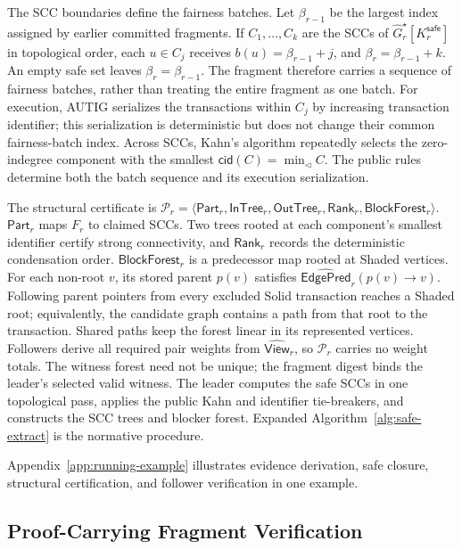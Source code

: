 The SCC boundaries define the fairness batches.  Let $\beta_{r-1}$ be the
largest index assigned by earlier committed fragments.  If
$C_1,\ldots,C_k$ are the SCCs of
$\widehat G_r^\star[K_r^{\mathsf{safe}}]$ in topological order, each
$u\in C_j$ receives $b(u)=\beta_{r-1}+j$, and
$\beta_r=\beta_{r-1}+k$.
An empty safe set leaves $\beta_r=\beta_{r-1}$.  The fragment therefore carries
a sequence of fairness batches, rather than treating the entire fragment as
one batch.  For execution, AUTIG serializes the transactions within $C_j$ by
increasing transaction identifier; this serialization is deterministic but
does not change their common fairness-batch index.  Across SCCs, Kahn's
algorithm repeatedly selects the zero-indegree component with the smallest
$\mathsf{cid}(C)=\min_{\triangleleft} C$.  The public rules determine
both the batch sequence and its execution serialization.

The structural certificate is
$\mathcal P_r=\langle\mathsf{Part}_r,\mathsf{InTree}_r,
\mathsf{OutTree}_r,\mathsf{Rank}_r,\mathsf{BlockForest}_r\rangle$.
$\mathsf{Part}_r$ maps $F_r$ to claimed SCCs.  Two trees rooted at each
component's smallest identifier certify strong connectivity, and
$\mathsf{Rank}_r$ records the deterministic condensation order.
$\mathsf{BlockForest}_r$ is a predecessor map rooted at Shaded vertices.  For
each non-root $v$, its stored parent $p(v)$ satisfies
$\widehat{\mathsf{EdgePred}}_r(p(v)\to v)$.  Following parent pointers from
every excluded Solid transaction reaches a Shaded root; equivalently, the
candidate graph contains a path from that root to the transaction.  Shared
paths keep the forest linear in its represented vertices.  Followers derive
all required pair weights from $\widehat{\mathsf{View}}_r$, so $\mathcal P_r$
carries no weight totals.  The witness forest need not be unique; the fragment
digest binds the leader's selected valid witness.
The leader computes the safe SCCs in one topological pass, applies the public
Kahn and identifier tie-breakers, and constructs the SCC trees and blocker
forest.  Expanded Algorithm~\ref{alg:safe-extract} is the normative
procedure.

Appendix~\ref{app:running-example} illustrates evidence derivation, safe
closure, structural certification, and follower verification in one example.

\subsection{Proof-Carrying Fragment Verification}
\label{sec:proof-carrying-verification}

